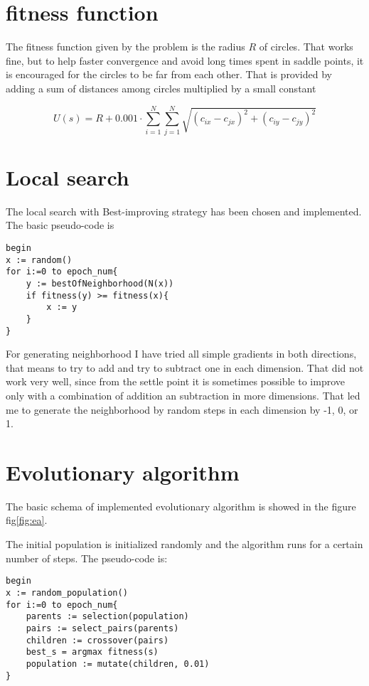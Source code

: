 \documentclass[paper=a4, fontsize=11pt]{scrartcl} %
\numberwithin{equation}{section} %
\numberwithin{figure}{section} %
\numberwithin{table}{section} %
\begin{document}
\section{fitness function}
The fitness function given by the problem is the radius $R$ of circles. That works fine, but to help faster convergence and avoid long times spent in saddle points, it is encouraged for the circles to be far from each other. That is provided by adding a sum of distances among circles multiplied by a small constant

\begin{equation}
U(s) = R + 0.001\cdot\sum_{i=1}^N\sum_{j=1}^N \sqrt{(c_{ix} - c_{jx})^2 + (c_{iy} - c_{jy})^2}
\end{equation}

\section{Local search}
The local search with Best-improving strategy has been chosen and implemented. The basic pseudo-code is 

\begin{lstlisting}[frame=single]  % Start your code-block
begin
x := random()
for i:=0 to epoch_num{
	y := bestOfNeighborhood(N(x))
	if fitness(y) >= fitness(x){
		x := y
	}
}
\end{lstlisting}

For generating neighborhood I have tried all simple gradients in both directions, that means to try to add and try to subtract one in each dimension. That did not work very well, since from the settle point it is sometimes possible to improve only with a combination of addition an subtraction in more dimensions. 
	That led me to generate the neighborhood by random steps in each dimension by -1, 0, or 1.
	
\section{Evolutionary algorithm}
The basic schema of implemented evolutionary algorithm is showed in the figure fig\ref{fig:ea}.
	
The initial population is initialized randomly and the algorithm runs for a certain number of steps. The pseudo-code is:

\begin{lstlisting}[frame=single]  % Start your code-block
begin
x := random_population()
for i:=0 to epoch_num{
	parents := selection(population)
	pairs := select_pairs(parents)
	children := crossover(pairs)
	best_s = argmax fitness(s)
	population := mutate(children, 0.01)
}
\end{lstlisting}
\end{document}
